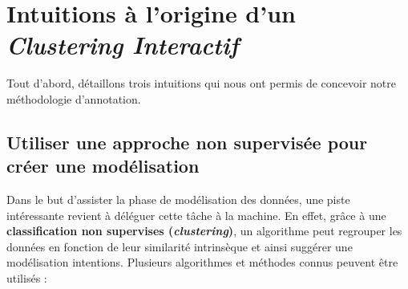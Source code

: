 \section{Intuitions à l'origine d'un \textit{Clustering Interactif}}
\label{section:3.1-INTUITIONS-ORIGINES}

	Tout d'abord, détaillons trois intuitions qui nous ont permis de concevoir notre méthodologie d'annotation.
	
	
	\subsection{Utiliser une approche non supervisée pour créer une modélisation}
	\label{section:3.1.1-INTUITIONS-ORIGINES-NON-SUPERVISEES}
	
		Dans le but d'assister la phase de modélisation des données, une piste intéressante revient à déléguer cette tâche à la machine.
		En effet, grâce à une \textbf{classification non supervises (\textit{clustering})}, un algorithme peut regrouper les données en fonction de leur similarité intrinsèque et ainsi suggérer une modélisation intentions.
		Plusieurs algorithmes et méthodes connus peuvent être utilisés :
		
